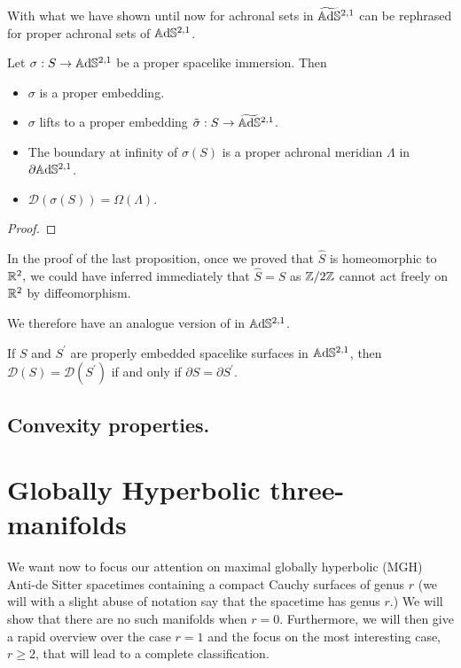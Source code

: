 With what we have shown until now for achronal sets in $\widetilde{\mathbb{A}\mathrm{d}\mathbb{S}}{}^{2,1}$ can be rephrased for proper achronal sets of $\mathbb{A}\mathrm{d}\mathbb{S}^{2,1}$. \\

\begin{proposition}
    Let $\sigma: S\to\mathbb{A}\mathrm{d}\mathbb{S}^{2,1}$ be a proper spacelike immersion. Then 
    \begin{itemize}
        \item $\sigma$ is a proper embedding.
        \item $\sigma$ lifts to a proper embedding $\tilde{\sigma}:S\to\widetilde{\mathbb{A}\mathrm{d}\mathbb{S}}{}^{2,1}$.
        \item The boundary at infinity of $\sigma(S)$ is a proper achronal meridian $\Lambda$ in $\partial\mathbb{A}\mathrm{d}\mathbb{S}^{2,1}$.
        \item $\mathcal{D}(\sigma(S))=\Omega(\Lambda).$
    \end{itemize}
\end{proposition}

\begin{proof}
\end{proof}

\begin{observation}
    In the proof of the last proposition, once we proved that $\hat{S}$ is homeomorphic to $\mathbb{R}^2,$ we could have inferred immediately that $\hat{S}=S$ as $\mathbb{Z}/2\mathbb{Z}$ cannot act freely on $\mathbb{R}^2$ by diffeomorphism. 
\end{observation}

We therefore have an analogue version of  in $\mathbb{A}\mathrm{d}\mathbb{S}^{2,1}$.

\begin{corollary}
    If $S$ and $S^{\prime}$ are properly embedded spacelike surfaces in $\mathbb{A}\mathrm{d}\mathbb{S}^{2,1}$, then $\mathcal{D}(S)=\mathcal{D}(S^{\prime})$ if and only if $\partial S=\partial S^{\prime}$. 
\end{corollary}

\subsection{Convexity properties.}

\section{Globally Hyperbolic three-manifolds}
We want now to focus our attention on maximal globally hyperbolic (MGH) Anti-de Sitter spacetimes containing a compact Cauchy surfaces of genus $r$ (we will with a slight abuse of notation say that the spacetime has genus $r$.) We will show that there are no such manifolds when $r=0$. Furthermore, we will then give a rapid overview over the case $r=1$ and the focus on the most interesting case, $r\geq 2$, that will lead to a complete classification.

